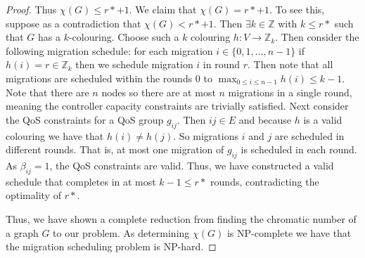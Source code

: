 \documentclass[letterpaper,12pt,titlepage,oneside,final]{article}
\begin{document}
\begin{proof}
    Thus $\chi(G) \leq r* + 1$. We claim that $\chi(G) = r* + 1$. To see this, suppose as a contradiction that $\chi(G) < r* + 1$. Then $\exists k \in \mathbb{Z}$ with $k \leq r*$ such that $G$ has a $k$-colouring. Choose such a $k$ colouring $h: V \rightarrow \mathbb{Z}_{k}$. Then consider the following migration schedule: for each migration $i \in \{0, 1, ..., n-1\}$ if $h(i) = r \in \mathbb{Z}_{k}$ then we schedule migration $i$ in round $r$. Then note that all migrations are scheduled within the rounds 0 to $\max_{0 \leq i \leq n-1} h(i) \leq k - 1$. Note that there are $n$ nodes so there are at most $n$ migrations in a single round, meaning the controller capacity constraints are trivially satisfied. Next consider the QoS constraints for a QoS group $g_{ij}$. Then $ij \in E$ and because $h$ is a valid colouring we have that $h(i) \neq h(j)$. So migrations $i$ and $j$ are scheduled in different rounds. That is, at most one migration of $g_{ij}$ is scheduled in each round. As $\beta_{ij} = 1$, the QoS constraints are valid. Thus, we have constructed a valid schedule that completes in at most $k - 1 \leq r*$ rounds, contradicting the optimality of $r*$.
    
    Thus, we have shown a complete reduction from finding the chromatic number of a graph $G$ to our problem. As determining $\chi(G)$ is NP-complete we have that the migration scheduling problem is NP-hard. 
\end{proof}

\newpage



\end{document}
